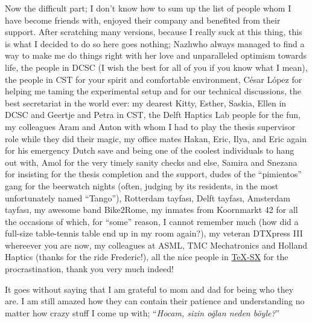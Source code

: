 Now the difficult part; I don't know how to sum up the list of people whom I have become friends with, enjoyed their company and benefited 
from their support. After scratching many versions, because I really suck at this thing, this is what I decided to do so here goes nothing; 
Nazl\i\space who always managed to find a way to make me do things right with her love and unparalleled optimism towards life, the people 
in DCSC (I wish the best for all of you if you know what I mean), the people in CST for your spirit and comfortable environment, C\'{e}sar 
L\'{o}pez for helping me taming the experimental setup and for our technical discussions, the best secretariat in the world ever: my dearest 
Kitty, Esther, Saskia, Ellen in DCSC and Geertje and Petra in CST, the Delft Haptics Lab people for the fun, my colleagues Aram and Anton 
with whom I had to play the thesis supervisor role while they did their magic, my office mates Hakan, Eric, Ilya, and Eric again for his 
emergency Dutch save and being one of the coolest individuals to hang out with, Amol for the very timely sanity checks and else, 
Samira and Snezana for insisting for the thesis completion and the support, dudes of the \enquote{pimientos} 
gang for the beerwatch nights (often, judging by its residents, in the most unfortunately named \enquote{Tango}), Rotterdam tayfas\i, Delft 
tayfas\i, Amsterdam tayfas\i, my awesome band Bike2Rome, my inmates from Koornmarkt 42 for all the occasions of which, for \enquote{some} 
reason, I cannot remember much (how did a full-size table-tennis table end up in my room again?), my veteran DTXpress III whereever you are 
now, my colleagues at ASML, TMC Mechatronics and Holland Haptics (thanks for the ride Frederic!), all the nice people in 
\href{http://tex.stackexchange.com}{\TeX-SX} for the procrastination, thank you very much indeed!

It goes without saying that I am grateful to mom and dad for being who they are. I am still amazed how they can contain their patience and 
understanding no matter how crazy stuff I come up with; \enquote{\emph{Hocam, sizin o\u{g}lan neden b\"{o}yle?}}